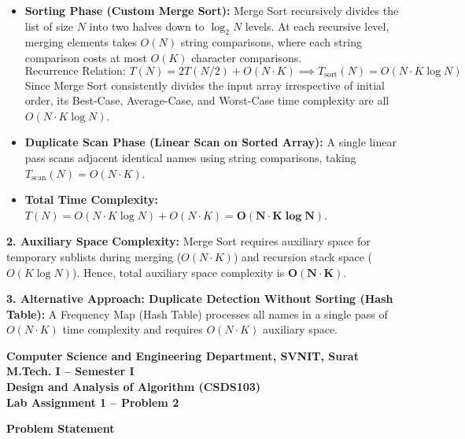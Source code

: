 \documentclass[12pt]{article}
\begin{document}
\begin{itemize}
    \item \textbf{Sorting Phase (Custom Merge Sort):} Merge Sort recursively divides the list of size $N$ into two halves down to $\log_2 N$ levels. At each recursive level, merging elements takes $O(N)$ string comparisons, where each string comparison costs at most $O(K)$ character comparisons.
    $$\text{Recurrence Relation: } T(N) = 2T(N/2) + O(N \cdot K) \implies T_{\text{sort}}(N) = O(N \cdot K \log N)$$
    Since Merge Sort consistently divides the input array irrespective of initial order, its Best-Case, Average-Case, and Worst-Case time complexity are all $O(N \cdot K \log N)$.
    \item \textbf{Duplicate Scan Phase (Linear Scan on Sorted Array):} A single linear pass scans adjacent identical names using string comparisons, taking $T_{\text{scan}}(N) = O(N \cdot K)$.
    \item \textbf{Total Time Complexity:} $T(N) = O(N \cdot K \log N) + O(N \cdot K) = \mathbf{O(N \cdot K \log N)}$.
\end{itemize}

\textbf{2. Auxiliary Space Complexity:}
Merge Sort requires auxiliary space for temporary sublists during merging ($O(N \cdot K)$) and recursion stack space ($O(K \log N)$). Hence, total auxiliary space complexity is $\mathbf{O(N \cdot K)}$.

\textbf{3. Alternative Approach: Duplicate Detection Without Sorting (Hash Table):}
A Frequency Map (Hash Table) processes all names in a single pass of $O(N \cdot K)$ time complexity and requires $O(N \cdot K)$ auxiliary space.

\newpage


\begin{center}
\textbf{Computer Science and Engineering Department, SVNIT, Surat}\\
\textbf{M.Tech. I -- Semester I}\\
\textbf{Design and Analysis of Algorithm (CSDS103)}\\
\textbf{Lab Assignment 1 -- Problem 2}
\end{center}

\vspace{0.4cm}

\textbf{Problem Statement}
\end{document}
